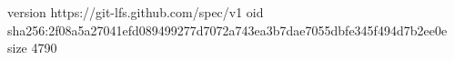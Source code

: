 version https://git-lfs.github.com/spec/v1
oid sha256:2f08a5a27041efd089499277d7072a743ea3b7dae7055dbfe345f494d7b2ee0e
size 4790
